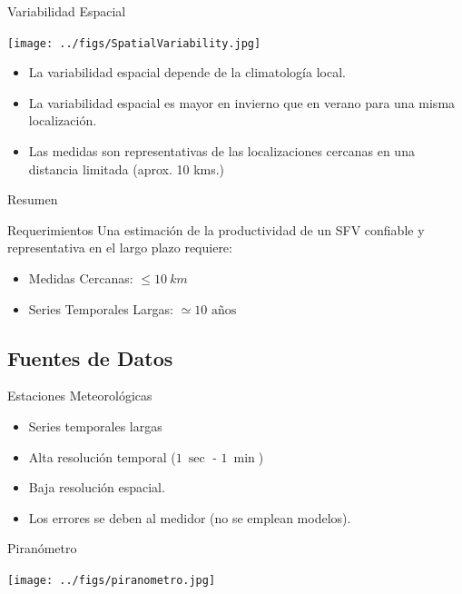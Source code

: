 \documentclass[xcolor={usenames,svgnames,dvipsnames}]{beamer}
\begin{document}
\begin{frame}[label={sec:org7a48cb9}]{Variabilidad Espacial}
\begin{center}
\texttt{[image: ../figs/SpatialVariability.jpg]}
\end{center}

\begin{itemize}
\item La variabilidad espacial depende de la \alert{climatología local}.
\item La variabilidad espacial es \alert{mayor en invierno que en verano} para una misma localización.
\item Las medidas son representativas de las localizaciones cercanas en una distancia limitada (aprox. 10 kms.)
\end{itemize}
\end{frame}

\begin{frame}[label={sec:org5591d72}]{Resumen}
\begin{block}{Requerimientos}
Una estimación de la productividad de un SFV confiable y representativa en el largo plazo requiere:
\begin{itemize}
\item \alert{Medidas Cercanas}: \(\leq \SI{10}{km}\)
\item \alert{Series Temporales Largas}: \(\simeq 10 \text{ años}\)
\end{itemize}
\end{block}
\end{frame}

\subsection{Fuentes de Datos}
\label{sec:org0b7c705}
\begin{frame}[label={sec:orgbeab156}]{Estaciones Meteorológicas}
\begin{itemize}
\item Series temporales largas
\item Alta resolución temporal (\(\SI{1}{\sec}\) - \(\SI{1}{\min}\))
\item Baja resolución espacial.
\item Los errores se deben al medidor (no se emplean modelos).
\end{itemize}

\begin{block}{Piranómetro}
\begin{center}
\texttt{[image: ../figs/piranometro.jpg]}
\end{center}
\end{block}
\end{frame}
\end{document}

